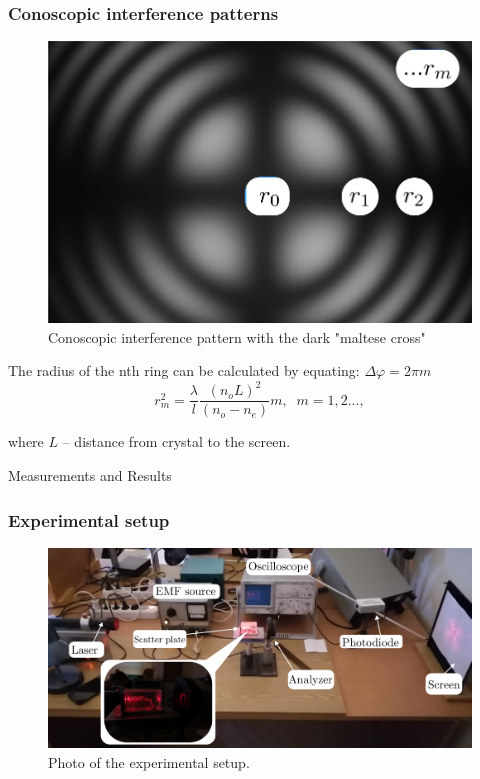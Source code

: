\documentclass{beamer}
\begin{document}
\begin{frame}
	\frametitle{Conoscopic interference patterns}
	
	\begin{figure}
		\centering
		\includegraphics[width=0.5\linewidth]{res/pattern}
		\caption{Conoscopic interference pattern with the dark "maltese cross"}
	\end{figure}
	
	\footnotesize
	The radius of the nth ring can be calculated by equating: $\Delta \varphi = 2 \pi m$
	$$r^2_m = \frac{\lambda}{l} \frac{(n_o L)^2}{(n_o-n_e)} m,\;\; m = 1,2...,$$
	
	where $L$ -- distance from crystal to the screen.
\end{frame}
	
\begin{frame}[plain,c]	
	\begin{center}
		\huge {} Measurements and Results
	\end{center}
\end{frame}	

\begin{frame}
	\frametitle{Experimental setup}
	\begin{figure}
		\centering
		\includegraphics[width=1\linewidth]{res/setup}
		\vspace{-10pt}
		\caption{\footnotesize Photo of the experimental setup. }
	\end{figure}
\end{frame}
\end{document}

